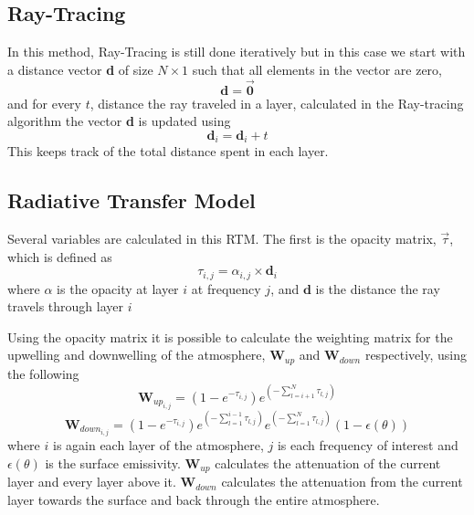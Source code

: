 \subsection{Ray-Tracing}
In this method, Ray-Tracing is still done iteratively but in this case we start with a distance vector \textbf{d} of size $N \times 1$ such that all elements in the vector are zero,
\begin{equation*}
\textbf{d} = \vec{\textbf{0}}
\end{equation*}
and for every $t$, distance the ray traveled in a layer, calculated in the Ray-tracing algorithm the vector \textbf{d} is updated using
\begin{equation}
\textbf{d}_i = \textbf{d}_i + t 
\end{equation}
This keeps track of the total distance spent in each layer.

\subsection{Radiative Transfer Model}

Several variables are calculated in this RTM. The first is the opacity matrix, $\vec{\tau}$, which is defined as
\begin{equation}
\tau_{i,j} = \alpha_{i,j} \times \textbf{d}_i
\end{equation}
where $\alpha$ is the opacity at layer $i$ at frequency $j$, and $\textbf{d}$ is the distance the ray travels through layer $i$

Using the opacity matrix it is possible to calculate the weighting matrix for the upwelling and downwelling of the atmosphere, $\textbf{W}_{up}$ and $\textbf{W}_{down}$ respectively, using the following
\begin{equation}
\textbf{W}_{up_{i,j}} = (1-e^{-\tau_{i,j}})e^{\left(-\sum_{l=i+1}^N \tau_{l,j}\right)}
\end{equation}
\begin{equation}
\textbf{W}_{down_{i,j}} = (1-e^{-\tau_{i,j}})e^{\left(-\sum_{l=1}^{i-1} \tau_{l,j}\right)} e^{\left(-\sum_{l=1}^{N} \tau_{l,j}\right)} (1- \epsilon(\theta))
\end{equation}
where $i$ is again each layer of the atmosphere, $j$ is each frequency of interest and $\epsilon(\theta)$ is the surface emissivity. $\textbf{W}_{up}$ calculates the attenuation of the current layer and every layer above it. $\textbf{W}_{down}$ calculates the attenuation from the current layer towards the surface and back through the entire atmosphere. 

